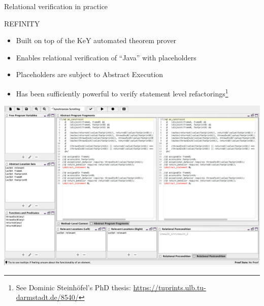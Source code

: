 \begin{frame}{Relational verification in practice}
  \begin{block}{REFINITY}
    \begin{itemize}
      \setlength\itemsep{0.5\itemsep}
    \item Built on top of the KeY automated theorem prover
    \item Enables relational verification of ``Java'' with placeholders
    \item Placeholders are subject to Abstract Execution
    \item Has been sufficiently powerful to verify statement level refactorings\footnote{See Dominic Steinhöfel's PhD thesis: \href{Abstract Execution}{https://tuprints.ulb.tu-darmstadt.de/8540/}}
    \end{itemize}
  \end{block}
\end{frame}

\begin{frame}\vspace*{-5mm}
  \begin{center}
    \includegraphics[scale=.25]{screenshots/SlideAbstract}
  \end{center}    
\end{frame}

